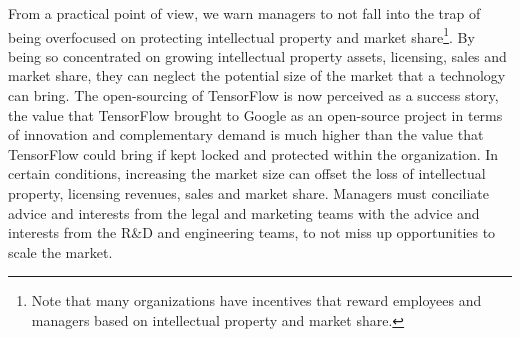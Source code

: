 \documentclass[CHICAGO,Times1COL]{WileyNJDv5} %
\begin{document}
 
 From a practical point of view, we warn managers to not fall into the trap of being overfocused on protecting intellectual property and market share\footnote{Note that many organizations have incentives that reward employees and managers based on intellectual property and market share.}. By being so concentrated on growing intellectual property assets, licensing, sales and market share, they can neglect the potential size of the market that a technology can bring.  The open-sourcing of TensorFlow is now perceived as a success story, the value that TensorFlow brought to Google as an open-source project in terms of innovation and complementary demand is much higher than the value that TensorFlow could bring if kept locked and protected within the organization. In certain conditions, increasing the market size can offset the loss of intellectual property, licensing revenues, sales and market share. Managers must conciliate advice and interests from the legal and marketing teams with the advice and interests from the  R\&D and engineering teams,  to not miss up opportunities to scale the market.  

 


 
 
 

\end{document}
